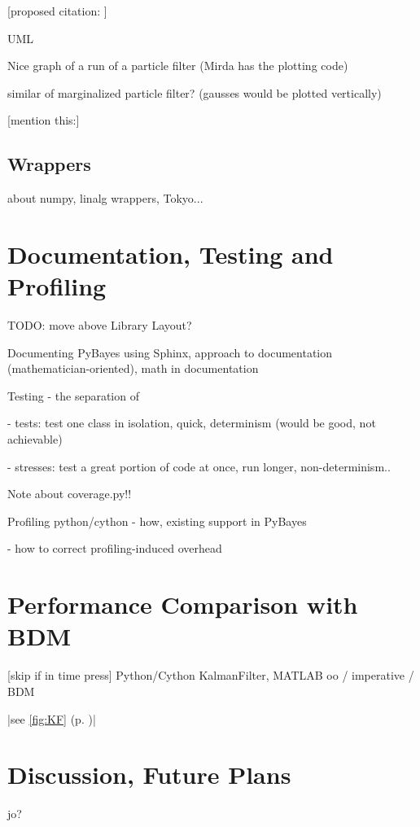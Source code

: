 [proposed citation: \cite{Smi:05}]

UML

Nice graph of a run of a particle filter (Mirda has the plotting code)

similar of marginalized particle filter? (gausses would be plotted vertically)

[mention this:\cite{Smi:10}]

\subsection{Wrappers} \label{sec:PyBayesWrappers}

about numpy, linalg wrappers, Tokyo...

\section{Documentation, Testing and Profiling} \label{sec:PyBayesDocsTests}

TODO: move above Library Layout?

Documenting PyBayes using Sphinx, approach to documentation (mathematician-oriented), math in documentation

Testing - the separation of

- tests: test one class in isolation, quick, determinism (would be good, not achievable)

- stresses: test a great portion of code at once, run longer, non-determinism..

Note about coverage.py!!

Profiling python/cython - how, existing support in PyBayes

- how to correct profiling-induced overhead

\section{Performance Comparison with BDM} \label{sec:PyBayesPerformance}

[skip if in time press]
Python/Cython KalmanFilter, MATLAB oo / imperative / BDM

|see \autoref{fig:KF} (p. \pageref{fig:KF})|

\section{Discussion, Future Plans}

jo?
